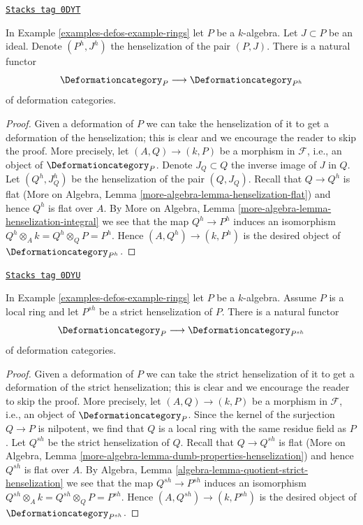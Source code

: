 \begin{lemma}[Henselization]
\label{examples-defos-lemma-henselization}
\href{https://stacks.math.columbia.edu/tag/0DYT}{\texttt{Stacks tag 0DYT}}

In Example \ref{examples-defos-example-rings} let $P$ be a $k$-algebra.
Let $J \subset P$ be an ideal.
Denote $(P^h, J^h)$ the henselization of the pair $(P, J)$.
There is a natural functor
$$
\Deformationcategory_P \longrightarrow \Deformationcategory_{P^h}
$$
of deformation categories.
\end{lemma}

\begin{proof}
Given a deformation of $P$ we can take the henselization
of it to get a deformation of the henselization; this is
clear and we encourage the reader to skip the proof. More precisely,
let $(A, Q) \to (k, P)$ be a morphism in $\mathcal{F}$, i.e.,
an object of $\Deformationcategory_P$. Denote $J_Q \subset Q$ the inverse
image of $J$ in $Q$. Let $(Q^h, J_Q^h)$ be the henselization of
the pair $(Q, J_Q)$. Recall that $Q \to Q^h$ is flat
(More on Algebra, Lemma \ref{more-algebra-lemma-henselization-flat})
and hence $Q^h$ is flat over $A$.
By More on Algebra, Lemma \ref{more-algebra-lemma-henselization-integral}
we see that the map $Q^h \to P^h$ induces an isomorphism
$Q^h \otimes_A k = Q^h \otimes_Q P = P^h$.
Hence $(A, Q^h) \to (k, P^h)$ is the desired object of
$\Deformationcategory_{P^h}$.
\end{proof}

\begin{lemma}
\label{examples-defos-lemma-strict-henselization}
\href{https://stacks.math.columbia.edu/tag/0DYU}{\texttt{Stacks tag 0DYU}}

In Example \ref{examples-defos-example-rings} let $P$ be a $k$-algebra.
Assume $P$ is a local ring and let $P^{sh}$ be a strict henselization of $P$.
There is a natural functor
$$
\Deformationcategory_P \longrightarrow \Deformationcategory_{P^{sh}}
$$
of deformation categories.
\end{lemma}

\begin{proof}
Given a deformation of $P$ we can take the strict henselization
of it to get a deformation of the strict henselization; this is
clear and we encourage the reader to skip the proof. More precisely,
let $(A, Q) \to (k, P)$ be a morphism in $\mathcal{F}$, i.e.,
an object of $\Deformationcategory_P$. Since the kernel of the surjection
$Q \to P$ is nilpotent, we find that $Q$ is a local ring with the
same residue field as $P$. Let $Q^{sh}$ be the strict henselization
of $Q$. Recall that $Q \to Q^{sh}$ is flat
(More on Algebra, Lemma \ref{more-algebra-lemma-dumb-properties-henselization})
and hence $Q^{sh}$ is flat over $A$.
By Algebra, Lemma \ref{algebra-lemma-quotient-strict-henselization}
we see that the map $Q^{sh} \to P^{sh}$ induces an isomorphism
$Q^{sh} \otimes_A k = Q^{sh} \otimes_Q P = P^{sh}$.
Hence $(A, Q^{sh}) \to (k, P^{sh})$ is the desired object of
$\Deformationcategory_{P^{sh}}$.
\end{proof}

